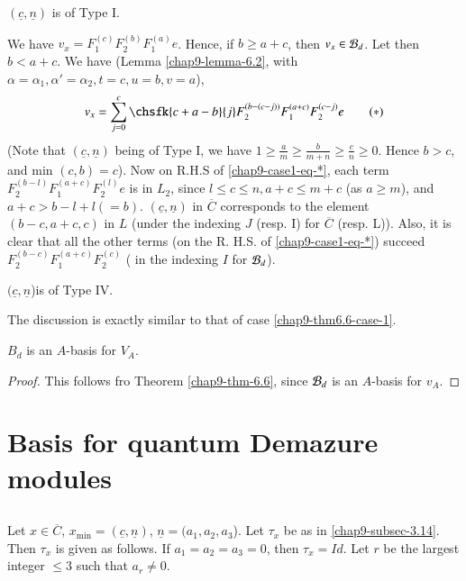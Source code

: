 \setcounter{case}{0}
\begin{case}\label{chap9-thm6.6-case-1}
$(\underline{c},\underline{n})$ is of Type I.

We have $v_{x}= F_{1}^{(c)}F_{2}^{(b)}F_{1}^{(a)}e$. Hence, if $b \geq a + c$, then $v_{x} \in \mathcal{B}_{d}$. Let then $b < a + c$. We have (Lemma \ref{chap9-lemma-6.2}, with $\alpha = \alpha_{1}, \alpha' = \alpha_{2}, t =c, u=b, v=a$),
\begin{equation}\label{chap9-case1-eq-*}
v_{x} = \sum\limits_{j=0}^{c}\chsfk{c + a-b}{j} F_{2}^{(b-(c-j))}F_{1}^{(a+c)}F_{2}^{(c-j)}e\tag{$\ast$}
\end{equation}
(Note that $(\underline{c}, \underline{n})$ being of Type I, we have
$1 \geq \frac{a}{m} \geq \frac{b}{m+n} \geq \frac{c}{n} \geq 0$. Hence $b > c$, and min $(c,b)=c$). Now on R.H.S of \eqref{chap9-case1-eq-*}, each term $F_{2}^{(b-l)}F_{1}^{(a+c)}F_{2}^{(l)}e$ is in $L_{2}$, since $l \leq  c \leq n, a + c\leq m + c$ (as $a \geq m$), and $a+ c > b-l + l (= b)$. $(\underline{c}, \underline{n})$ in $\overline{C}$ corresponds to the element $(b-c, a+ c, c)$ in $L$ (under the indexing $J$ (resp. I) for $\overline{C}$ (resp. L)). Also, it is clear that all the other terms (on the R. H.S.
of \eqref{chap9-case1-eq-*}) succeed $F_{2}^{(b-c)}F_{1}^{(a+ c)}F_{2}^{(c)}$ ( in the indexing $I$ for $\mathcal{B}_{d}$). 
\end{case}

\begin{case}\label{chap9-thm6.6-case-2}
$(\underline{c},\underline{n}$)\pageoriginale is of Type IV.

The discussion is exactly similar to that of case \ref{chap9-thm6.6-case-1}.
\end{case}

\setcounter{definition}{6}
\begin{secthm}\label{chap9-thm-6.7}
$B_{d}$ is an $A$-basis for $V_{A}$.
\end{secthm}

\begin{proof}
This follows fro  Theorem \ref{chap9-thm-6.6}, since $\mathcal{B}_{d}$ is an $A$-basis for $v_{A}$.
\end{proof}

\section{Basis for quantum Demazure modules}\label{chap9-sec-7}

\subsection{}\label{chap9-subsec-7.1}
Let $x \in \overline{C}$, $x_{\min} = (\underline{c}, \underline{n})$, $\underline{n} = (a_{1}, a_{2},a_{3}$). Let $\tau_{x}$ be as in
\ref{chap9-subsec-3.14}. Then $\tau_{x}$ is given as follows. If $a_{1}= a_{2} =a_{3} = 0$, then $\tau_{x}= Id$. Let $r$ be the largest integer $\leq 3$ such that $a_{r}  \neq 0$. 


